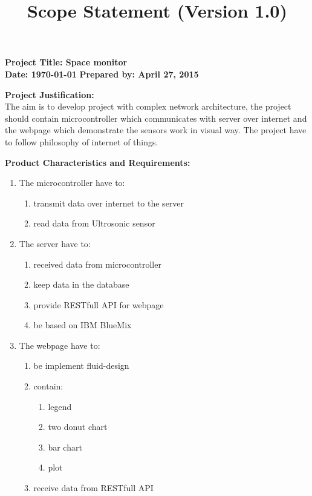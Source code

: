 \documentclass[english]{article}
\date{}
\title{Scope Statement (Version 1.0)}
\begin{document}
\maketitle


\begin{framed}
\textbf{Project Title:  Space monitor } \\
\textbf{Date: \today}
\textbf{Prepared by: April 27, 2015 }
\end{framed}
\begin{framed}
  \textbf{Project Justification:} \\
  The aim is to develop project with complex network architecture, the project should contain microcontroller which communicates with server over internet and the webpage which demonstrate the sensors work in visual way. The project have to follow philosophy of internet of things.
  \end{framed}
  \begin{framed}
   \textbf{Product Characteristics and Requirements:}
\begin{enumerate}
  \item The microcontroller have to:
  \begin{enumerate}
  \item transmit data over internet to the server
  \item read data from Ultrosonic sensor 
	\end{enumerate}
  \item The server have to:
    \begin{enumerate}
  \item received data from microcontroller
  \item keep data in the database
  \item provide RESTfull API for webpage
  \item be based on IBM BlueMix
	\end{enumerate}
  \item The webpage have to:
    \begin{enumerate}
  \item be implement fluid-design 
  \item contain:
  \begin{enumerate}
  \item legend
  \item two donut chart
  \item bar chart
  \item plot
	\end{enumerate}
  \item receive data from RESTfull API
	\end{enumerate}
\end{enumerate}
  \end{framed}
\end{document}
